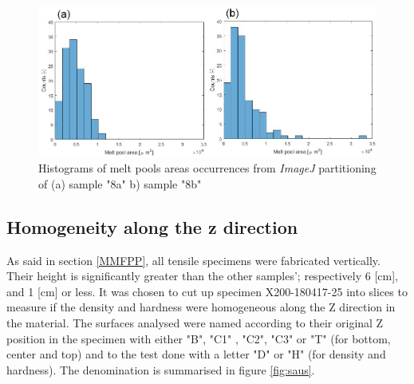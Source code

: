\begin{figure}[ht]
\centering
\centerline{\includegraphics[scale=0.7]{Images/HistB1}}
\decoRule
\caption[Histograms of melt pools areas occurrences from \textit{ImageJ} partitioning of (a) sample "8a"  b) sample "8b"]{Histograms of melt pools areas occurrences from \textit{ImageJ} partitioning of (a) sample "8a"  b) sample "8b"}
\label{fig:HistB1}
\end{figure} 

 \begin{center}
\begin{table}[ht]
\noindent{}

\caption[Summary of the melt pools areas distributions for samples "8a" and "8b"]{Summary of the melt pools areas distributions for samples "8a" and "8b"}
\label{tab:tracMAB}
\end{table}
 \end{center}

\subsection{Homogeneity along the z direction}
As said in section \ref{MMFPP}, all tensile specimens were fabricated vertically. Their height is significantly greater than the other samples'; respectively 6 [cm], and 1 [cm] or less. It was chosen to cut up specimen X200-180417-25 into slices to measure if the density and hardness were homogeneous along the Z direction in the material. The surfaces analysed were named according to their original Z position in the specimen with either "B", "C1" , "C2", "C3" or "T" (for bottom, center and top) and to the test done with a letter "D" or "H"  (for density and hardness). The denomination is summarised in figure \ref{fig:saus}.\\


